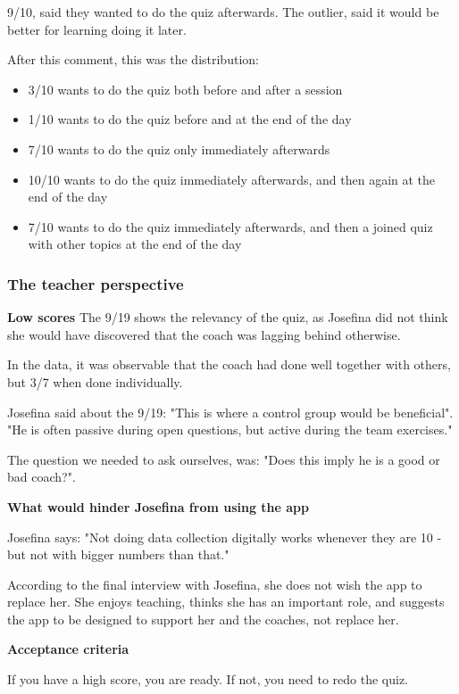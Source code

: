     9/10, said they wanted to do the quiz afterwards. The outlier, said it would be better for learning doing it later.

    After this comment, this was the distribution:

    \begin{itemize}
    \item 3/10 wants to do the quiz both before and after a session
    \item 1/10 wants to do the quiz before and at the end of the day
    \item 7/10 wants to do the quiz only immediately afterwards
    \item 10/10 wants to do the quiz immediately afterwards, and then again at the end of the day
    \item 7/10 wants to do the quiz immediately afterwards, and then a joined quiz with other topics at the end of the day
    \end{itemize}

\subsubsection{The teacher perspective}

  \textbf{Low scores}
  The 9/19 shows the relevancy of the quiz, as Josefina did not think she would have discovered that the coach was lagging behind otherwise.

  In the data, it was observable that the coach had done well together with others, but 3/7 when done individually.

  Josefina said about the 9/19: "This is where a control group would be beneficial". "He is often passive during open questions, but active during the team exercises."

  The question we needed to ask ourselves, was: "Does this imply he is a good or bad coach?".

  \textbf{What would hinder Josefina from using the app}

  Josefina says: "Not doing data collection digitally works whenever they are 10 - but not with bigger numbers than that."

  According to the final interview with Josefina, she does not wish the app to replace her. She enjoys teaching, thinks she has an important role, and suggests the app to be designed to support her and the coaches, not replace her.

  \textbf{Acceptance criteria}

  If you have a high score, you are ready. If not, you need to redo the quiz.

